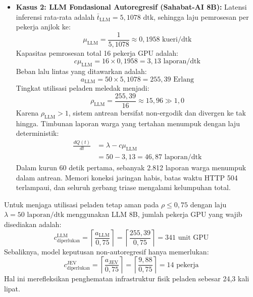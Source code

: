 \documentclass[journal,compsoc]{IEEEtran}
\begin{document}
\begin{itemize}
    \item \textbf{Kasus 2: LLM Fondasional Autoregresif (Sahabat-AI 8B):}
    Latensi inferensi rata-rata adalah $\bar{t}_{\text{LLM}} = 5{,}1078 \text{ dtk}$, sehingga laju pemrosesan per pekerja anjlok ke:
    \begin{equation}
    \mu_{\text{LLM}} = \frac{1}{5{,}1078} \approx 0{,}1958 \text{ kueri/dtk}
    \end{equation}
    Kapasitas pemrosesan total 16 pekerja GPU adalah:
    \begin{equation}
    c \mu_{\text{LLM}} = 16 \times 0{,}1958 = 3{,}13 \text{ laporan/dtk}
    \end{equation}
    Beban lalu lintas yang ditawarkan adalah:
    \begin{equation}
    a_{\text{LLM}} = 50 \times 5{,}1078 = 255{,}39 \text{ Erlang}
    \end{equation}
    Tingkat utilisasi peladen meledak menjadi:
    \begin{equation}
    \rho_{\text{LLM}} = \frac{255{,}39}{16} \approx 15{,}96 \gg 1{,}0
    \end{equation}
    Karena $\rho_{\text{LLM}} > 1$, sistem antrean bersifat non-ergodik dan divergen ke tak hingga. Timbunan laporan warga yang tertahan menumpuk dengan laju deterministik:
    \begin{equation}
    \begin{aligned}
    \frac{d Q(t)}{dt} &= \lambda - c \mu_{\text{LLM}} \\
    &= 50 - 3{,}13 = 46{,}87 \text{ laporan/dtk}
    \end{aligned}
    \end{equation}
    Dalam kurun 60 detik pertama, sebanyak 2.812 laporan warga menumpuk dalam antrean. Memori koneksi jaringan habis, batas waktu HTTP 504 terlampaui, dan seluruh gerbang triase mengalami kelumpuhan total.
\end{itemize}

Untuk menjaga utilisasi peladen tetap aman pada $\rho \le 0{,}75$ dengan laju $\lambda = 50 \text{ laporan/dtk}$ menggunakan LLM 8B, jumlah pekerja GPU yang wajib disediakan adalah:
\begin{equation}
c_{\text{diperlukan}}^{\text{LLM}} = \left\lceil \frac{a_{\text{LLM}}}{0{,}75} \right\rceil = \left\lceil \frac{255{,}39}{0{,}75} \right\rceil = 341 \text{ unit GPU}
\end{equation}
Sebaliknya, model keputusan non-autoregresif hanya memerlukan:
\begin{equation}
c_{\text{diperlukan}}^{\text{JEV}} = \left\lceil \frac{a_{\text{JEV}}}{0{,}75} \right\rceil = \left\lceil \frac{9{,}88}{0{,}75} \right\rceil = 14 \text{ pekerja}
\end{equation}
Hal ini merefleksikan penghematan infrastruktur fisik peladen sebesar 24,3 kali lipat.
\end{document}

